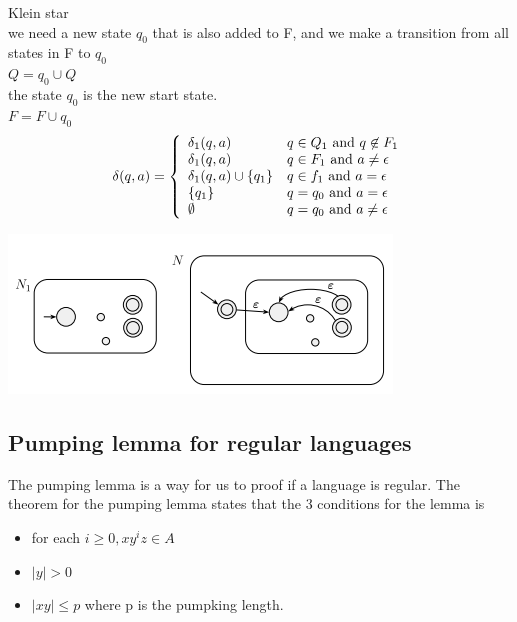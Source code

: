 \documentclass[a4paper,10pt,titlepage]{report}
\begin{document}
\begin{multicols}{2}
Klein star\\
we need a new state $q_0$ that is also added to F, and we make a transition from all states in F to $q_0$\\

$ Q = q_0 \cup Q$ \\
the state $q_0$ is the new start state.\\
$F = F \cup q_0$ \\
\[
\delta(q,a) = \left\{
 \begin{array}{ll}
\delta_1(q,a) 			 & q \in Q_1$ and $q \not\in F_1  \\
\delta_1(q,a)  			 & q \in F_1$ and $ a \neq \epsilon \\
\delta_1(q,a)\cup\{q_1\} & q\in f_1 $ and $ a = \epsilon \\
\{q_1\}					 & q = q_0$ and $ a = \epsilon \\
\emptyset				 & q = q_0$ and $ a \neq \epsilon \\
\end{array}
\right.
  \]

\includegraphics[scale=0.4,right]{Regular_Star.png}\\
\end{multicols}

\subsection{Pumping lemma for regular languages}

The pumping lemma is a way for us to proof if a language is regular. The theorem for the pumping lemma states that the 3 conditions for the lemma is\\
\begin{itemize}
\item for each $i \geq 0, xy^iz \in A $
\item $ |y| > 0 $
\item $ |xy| \leq p$ where p is the pumpking length. 
\end{itemize} 
\end{document}
